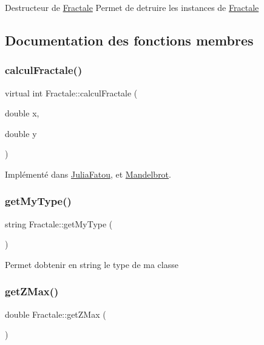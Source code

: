 Destructeur de \hyperlink{classFractale}{Fractale} Permet de detruire les instances de \hyperlink{classFractale}{Fractale} 

\subsection{Documentation des fonctions membres}
\mbox{\label{classFractale_a99a54c1b9b847ca24585f469cf03b67a}} 
\subsubsection{\texorpdfstring{calcul\+Fractale()}{calculFractale()}}
{\footnotesize\ttfamily virtual int Fractale\+::calcul\+Fractale (\begin{DoxyParamCaption}\item[{double}]{x,  }\item[{double}]{y }\end{DoxyParamCaption})\hspace{0.3cm}{\ttfamily [pure virtual]}}



Implémenté dans \hyperlink{classJuliaFatou_ac3fbb733a74a780dfc096df4ca64da69}{Julia\+Fatou}, et \hyperlink{classMandelbrot_afc2cf40855f646200d54c263929d3eca}{Mandelbrot}.

\mbox{\label{classFractale_aa7b38c97f45f50b5fbdde1188cf1978e}} 
\subsubsection{\texorpdfstring{get\+My\+Type()}{getMyType()}}
{\footnotesize\ttfamily string Fractale\+::get\+My\+Type (\begin{DoxyParamCaption}{ }\end{DoxyParamCaption})}

Permet d\textquotesingle{}obtenir en string le type de ma classe \mbox{\label{classFractale_ac3c0405c60e5688e116d39f75289dcf4}} 
\subsubsection{\texorpdfstring{get\+Z\+Max()}{getZMax()}}
{\footnotesize\ttfamily double Fractale\+::get\+Z\+Max (\begin{DoxyParamCaption}{ }\end{DoxyParamCaption})}

